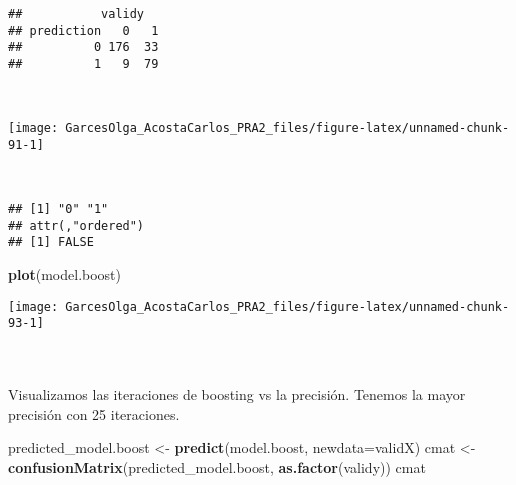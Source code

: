 \documentclass[
]{article}
\newenvironment{Shaded}{\begin{snugshade}}{\end{snugshade}}
\newcommand{\DataTypeTok}[1]{\textcolor[rgb]{0.13,0.29,0.53}{#1}}
\newcommand{\KeywordTok}[1]{\textcolor[rgb]{0.13,0.29,0.53}{\textbf{#1}}}
\newcommand{\NormalTok}[1]{#1}
\newcommand{\OperatorTok}[1]{\textcolor[rgb]{0.81,0.36,0.00}{\textbf{#1}}}
\newcommand{\StringTok}[1]{\textcolor[rgb]{0.31,0.60,0.02}{#1}}
\begin{document}
\begin{verbatim}
##           validy
## prediction   0   1
##          0 176  33
##          1   9  79
\end{verbatim}

\texttt{}\\
\texttt{}

\begin{Shaded}
\end{Shaded}

\begin{center}\texttt{[image: GarcesOlga\_AcostaCarlos\_PRA2\_files/figure-latex/unnamed-chunk-91-1]} \end{center}

\texttt{}~\\
\texttt{}

\begin{Shaded}
\end{Shaded}

\begin{verbatim}
## [1] "0" "1"
## attr(,"ordered")
## [1] FALSE
\end{verbatim}

\texttt{}

\begin{Shaded}
\begin{Highlighting}[]
\KeywordTok{plot}\NormalTok{(model.boost)}
\end{Highlighting}
\end{Shaded}

\begin{center}\texttt{[image: GarcesOlga\_AcostaCarlos\_PRA2\_files/figure-latex/unnamed-chunk-93-1]} \end{center}

\texttt{}~\\
\texttt{}~\\
Visualizamos las iteraciones de boosting vs la precisión. Tenemos la
mayor precisión con 25 iteraciones.

\texttt{}

\begin{Shaded}
\begin{Highlighting}[]
\NormalTok{predicted_model.boost <-}\StringTok{ }\KeywordTok{predict}\NormalTok{(model.boost, }\DataTypeTok{newdata=}\NormalTok{validX)}
\NormalTok{cmat <-}\StringTok{ }\KeywordTok{confusionMatrix}\NormalTok{(predicted_model.boost, }\KeywordTok{as.factor}\NormalTok{(validy))}
\NormalTok{cmat}
\end{Highlighting}
\end{Shaded}
\end{document}
